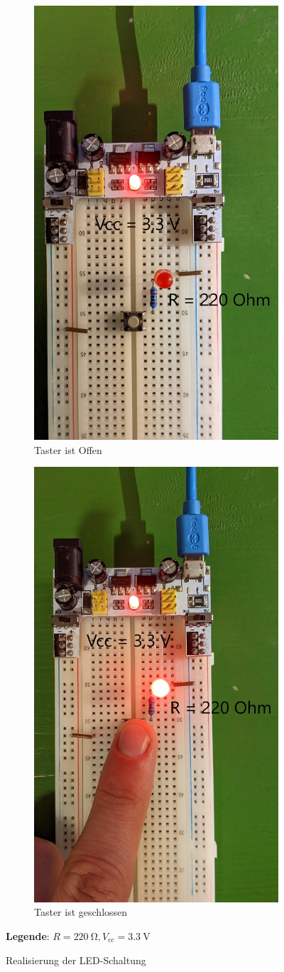 \documentclass[
    paper=a4,
]{scrartcl}
\newcommand{\legend}[1]{\par\footnotesize\textbf{Legende}: #1\par}
\begin{document}
    \begin{figure}[hb]
        \centering
        \begin{subfigure}[t]{0.5\textwidth}
            \centering
            \includegraphics[width=0.5\linewidth]{Anhang/Bild1.1.jpg}
            \caption{Taster ist Offen}
        \end{subfigure}\hfill%
        \begin{subfigure}[t]{0.5\textwidth}
            \centering
            \includegraphics[width=0.5\linewidth]{Anhang/Bild1.2.jpg}
            \caption{Taster ist geschlossen}
        \end{subfigure}
        \caption{Realisierung der LED-Schaltung}
        \legend{\(R=\SI{220}{\ohm}, V_{cc}=\SI{3.3}{\volt}\)}
        \label{fig:1}
    \end{figure}
\end{document}
